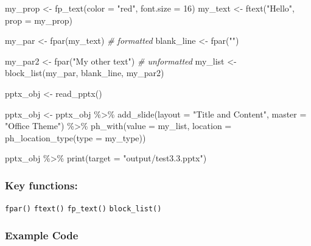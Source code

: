 \documentclass[
]{book}
\newenvironment{Shaded}{\begin{snugshade}}{\end{snugshade}}
\newcommand{\AttributeTok}[1]{\textcolor[rgb]{0.77,0.63,0.00}{#1}}
\newcommand{\CommentTok}[1]{\textcolor[rgb]{0.56,0.35,0.01}{\textit{#1}}}
\newcommand{\DecValTok}[1]{\textcolor[rgb]{0.00,0.00,0.81}{#1}}
\newcommand{\FunctionTok}[1]{\textcolor[rgb]{0.00,0.00,0.00}{#1}}
\newcommand{\NormalTok}[1]{#1}
\newcommand{\OtherTok}[1]{\textcolor[rgb]{0.56,0.35,0.01}{#1}}
\newcommand{\SpecialCharTok}[1]{\textcolor[rgb]{0.00,0.00,0.00}{#1}}
\newcommand{\StringTok}[1]{\textcolor[rgb]{0.31,0.60,0.02}{#1}}
\begin{document}
\begin{Shaded}
\begin{Highlighting}[]
\NormalTok{my\_prop }\OtherTok{\textless{}{-}} \FunctionTok{fp\_text}\NormalTok{(}\AttributeTok{color =} \StringTok{"red"}\NormalTok{, }\AttributeTok{font.size =} \DecValTok{16}\NormalTok{)}
\NormalTok{my\_text }\OtherTok{\textless{}{-}} \FunctionTok{ftext}\NormalTok{(}\StringTok{"Hello"}\NormalTok{, }\AttributeTok{prop =}\NormalTok{ my\_prop)}

\NormalTok{my\_par }\OtherTok{\textless{}{-}} \FunctionTok{fpar}\NormalTok{(my\_text) }\CommentTok{\# formatted}
\NormalTok{blank\_line }\OtherTok{\textless{}{-}} \FunctionTok{fpar}\NormalTok{(}\StringTok{""}\NormalTok{)}

\NormalTok{my\_par2 }\OtherTok{\textless{}{-}} \FunctionTok{fpar}\NormalTok{(}\StringTok{"My other text"}\NormalTok{) }\CommentTok{\# unformatted}
\NormalTok{my\_list }\OtherTok{\textless{}{-}} \FunctionTok{block\_list}\NormalTok{(my\_par, blank\_line, my\_par2)}

\NormalTok{pptx\_obj }\OtherTok{\textless{}{-}} \FunctionTok{read\_pptx}\NormalTok{()}

\NormalTok{pptx\_obj }\OtherTok{\textless{}{-}}\NormalTok{ pptx\_obj }\SpecialCharTok{\%\textgreater{}\%}
  \FunctionTok{add\_slide}\NormalTok{(}\AttributeTok{layout =} \StringTok{"Title and Content"}\NormalTok{, }\AttributeTok{master =} \StringTok{"Office Theme"}\NormalTok{) }\SpecialCharTok{\%\textgreater{}\%} 
  \FunctionTok{ph\_with}\NormalTok{(}\AttributeTok{value =}\NormalTok{ my\_list, }\AttributeTok{location =} \FunctionTok{ph\_location\_type}\NormalTok{(}\AttributeTok{type =}\NormalTok{ my\_type))}

\NormalTok{pptx\_obj }\SpecialCharTok{\%\textgreater{}\%}
  \FunctionTok{print}\NormalTok{(}\AttributeTok{target =} \StringTok{"output/test3.3.pptx"}\NormalTok{) }
\end{Highlighting}
\end{Shaded}

\hypertarget{key-functions-1}{%
\subsubsection{Key functions:}\label{key-functions-1}}

\texttt{fpar()} \texttt{ftext()} \texttt{fp\_text()} \texttt{block\_list()}

\hypertarget{example-code-1}{%
\subsubsection{Example Code}\label{example-code-1}}
\end{document}
